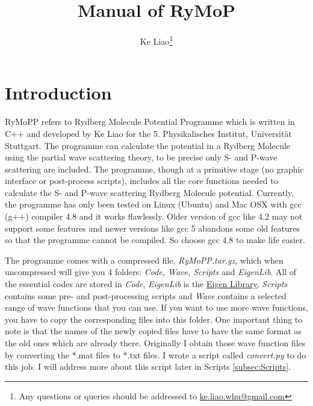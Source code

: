 \documentclass[british,english]{article}
\numberwithin{equation}{section}
\numberwithin{figure}{section}
\begin{document}
\title{Manual of RyMoP }

\author{Ke Liao\thanks{Any questions or queries should be addressed to \protect\href{mailto:ke.liao.whu@gmail.com}{ke.liao.whu@gmail.com}}}

\maketitle
\tableofcontents{}

\newpage

\section{Introduction}

RyMoPP refers to Rydberg Molecule Potential \foreignlanguage{british}{Program}me
which is written in C++ and developed by Ke Liao for the 5. Physikalisches
Institut, Universit\"at Stuttgart. The programme can calculate the
potential in a Rydberg Molecule using the partial wave scattering
theory, to be precise only S- and P-wave scattering are included.
The programme, though at a primitive stage (no graphic interface or
post-process scripts), includes all the core functions needed to calculate
the S- and P-wave scattering Rydberg Molecule potential. Currently,
the programme has only been tested on Linux (Ubuntu) and Mac OSX with
gcc (g++) compiler 4.8 and it works flawlessly. Older version of gcc
like 4.2 may not support some features and newer versions like gcc
5 abandons some old features so that the programme cannot be compiled.
So choose gcc 4.8 to make life easier.

The programme comes with a compressed file, \emph{RyMoPP.tar.gz},
which when uncompressed will give you 4 folders: \emph{Code, Wave,
Scripts }and \emph{EigenLib}. All of the essential codes are stored
in \emph{Code}, \emph{EigenLib }is the \href{http://eigen.tuxfamily.org/index.php?title=Main_Page}{Eigen Library},
\emph{Scripts }contains some pre- and post-processing scripts and
\emph{Wave }contains a selected range of wave functions that you can
use. If you want to use more wave functions, you have to copy the
corresponding files into this folder. One important thing to note
is that the names of the newly copied files have to have the same
format as the old ones which are already there. Originally I obtain
those wave function files by converting the {*}.mat files to {*}.txt
files. I wrote a script called \emph{convert.py} to do this job. I
will address more about this script later in Scripts \ref{subsec:Scripts}. 
\end{document}
